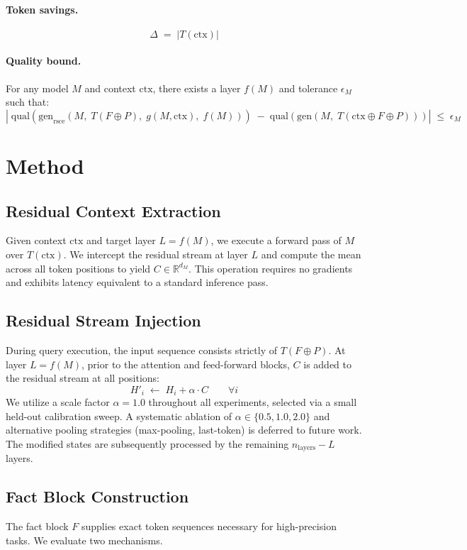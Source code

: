 \documentclass[11pt]{article}
\newcommand{\gen}{\mathrm{gen}}
\newcommand{\geni}{\mathrm{gen}_{\mathrm{rsce}}}
\newcommand{\qual}{\mathrm{qual}}
\newcommand{\ctx}{\mathrm{ctx}}
\begin{document}
\paragraph{Token savings.}
\[
    \Delta \;=\; |T(\ctx)|
\]

\paragraph{Quality bound.}
For any model $M$ and context $\ctx$, there exists a layer $f(M)$ and tolerance $\epsilon_M$ such that:
\[
    \left|\;\qual\!\left(\geni(M,\; T(F \oplus P),\; g(M,\ctx),\; f(M))\right)
    \;-\; \qual\!\left(\gen(M,\; T(\ctx \oplus F \oplus P))\right)\right|
    \;\leq\; \epsilon_M
\]

\section{Method}
\label{sec:method}

\subsection{Residual Context Extraction}
Given context $\ctx$ and target layer $L = f(M)$, we execute a forward pass of $M$ over $T(\ctx)$. We intercept the residual stream at layer $L$ and compute the mean across all token positions to yield $C \in \mathbb{R}^{d_M}$. This operation requires no gradients and exhibits latency equivalent to a standard inference pass.

\subsection{Residual Stream Injection}
During query execution, the input sequence consists strictly of $T(F \oplus P)$. At layer $L = f(M)$, prior to the attention and feed-forward blocks, $C$ is added to the residual stream at all positions:
\[
    H'_i \;\leftarrow\; H_i + \alpha \cdot C \qquad \forall i
\]
We utilize a scale factor $\alpha = 1.0$ throughout all experiments, selected via a small held-out calibration sweep. A systematic ablation of $\alpha \in \{0.5, 1.0, 2.0\}$ and alternative pooling strategies (max-pooling, last-token) is deferred to future work. The modified states are subsequently processed by the remaining $n_\text{layers} - L$ layers.

\subsection{Fact Block Construction}
\label{sec:fblock}
The fact block $F$ supplies exact token sequences necessary for high-precision tasks. We evaluate two mechanisms.
\end{document}
